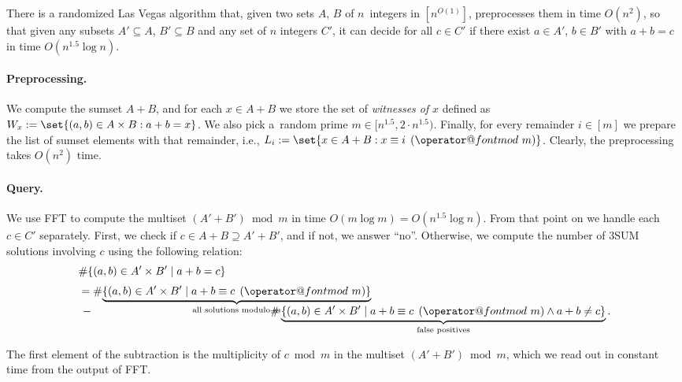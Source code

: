 \documentclass{theoretics}
\makeatletter
\newcommand{\tpmod}[1]{\mkern 8mu({\operator@font mod}\mkern 6mu#1)}
\makeatother
\begin{document}
\begin{theorem}\label{thm:unknowncrnd}
    There is a randomized Las Vegas algorithm that,
    given two sets $A$, $B$ of $n$~integers in $[n^{O(1)}]$, preprocesses them in time $O(n^2)$, so that given any subsets $A' \subseteq A$, $B' \subseteq B$ and any set of $n$ integers $C'$, it can decide for all $c \in C'$ if there exist $a \in A'$, $b \in B'$ with $a+b=c$ in time $O(n^{1.5} \log n)$.
\end{theorem}

\paragraph{Preprocessing.}
We compute the sumset $A+B$, and for each $x \in A+B$ we store the set of \emph{witnesses of} $x$ defined as $W_x := \set{ (a, b) \in A \times B : a + b = x}$. We also pick a~random prime $m \in [n^{1.5}, 2\cdot n^{1.5})$. Finally, for every remainder $i \in [m]$ we prepare the list of sumset elements with that remainder, i.e., $L_i := \set{x \in A+B : x \equiv i \tpmod{m}}$. Clearly, the preprocessing takes $O(n^2)$ time.

\paragraph{Query.}
We use FFT to compute the multiset $(A'+B') \bmod m$ in time $O(m \log m) = O(n^{1.5} \log n)$. From that point on we handle each $c \in C'$ separately. First, we check if $c \in A + B \supseteq A' + B'$, and if not, we answer ``no''. Otherwise, we compute the number of 3SUM solutions involving $c$ using the following relation:
\begin{align*}
& \# \{(a,b) \in A' \times B' \mid a+b=c\} \\[.3em]
& = \# \smash{\underbrace{\{(a,b) \in A' \times B' \mid a + b \equiv c \tpmod{m}\}}_{\text{all solutions modulo $m$}}} \\[.3em]
&\, - \hspace{16em} \# \underbrace{\{(a,b) \in A' \times B' \mid a + b \equiv c \tpmod{m} \land a + b \neq c\}}_{\text{false positives}}.
\end{align*}

The first element of the subtraction is the multiplicity of $c \bmod m$ in the multiset $(A'+B') \bmod m$, which we read out in constant time from the output of FFT.
\end{document}
